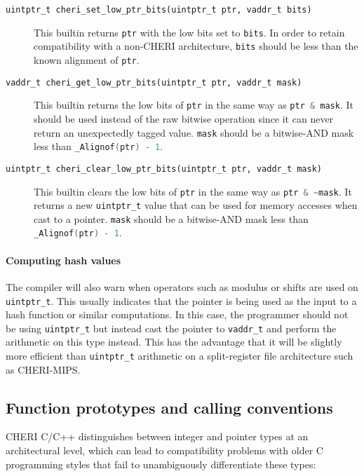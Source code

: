 \documentclass[11pt]{article}
\newcommand{\ccode}[1]{\lstinline[language={C},basicstyle=\small\ttfamily]{#1}}
\newcommand{\uintptr}{\texttt{uintptr\_t}\xspace}
\newcommand{\vaddrt}{\texttt{vaddr\_t}\xspace}
\begin{document}
\begin{description}
\item[\texttt{uintptr\_t cheri\_set\_low\_ptr\_bits(uintptr\_t ptr, vaddr\_t bits)}]
  This builtin returns \texttt{ptr} with the low bits set to \texttt{bits}. In order to retain
  compatibility with a non-CHERI architecture, \texttt{bits} should be less than the
  known alignment of \texttt{ptr}.
\item[\texttt{vaddr\_t cheri\_get\_low\_ptr\_bits(uintptr\_t ptr, vaddr\_t mask)}]
  This builtin returns the low bits of \texttt{ptr} in the same way as \ccode{ptr & mask}.
  It should be used instead of the raw bitwise operation since it can never return
  an unexpectedly tagged value.
  \texttt{mask} should be a bitwise-AND mask less than \ccode{_Alignof(ptr) - 1}.
\item[\texttt{uintptr\_t cheri\_clear\_low\_ptr\_bits(uintptr\_t ptr, vaddr\_t mask)}]
  This builtin clears the low bits of \texttt{ptr} in the same way as \ccode{ptr & ~mask}.
  It returns a new \uintptr value that can be used for memory accesses when cast to a pointer.
  \texttt{mask} should be a bitwise-AND mask less than \ccode{_Alignof(ptr) - 1}.
\end{description}

\paragraph{Computing hash values}

The compiler will also warn when operators such as modulus or shifts are used on
\uintptr. This usually indicates that the pointer is being used as the input to a hash
function or similar computations.
In this case, the programmer should not be using \uintptr but instead cast the pointer
to \vaddrt and perform the arithmetic on this type instead.
This has the advantage that it will be slightly more efficient than \uintptr arithmetic on
a split-register file architecture such as CHERI-MIPS.


\subsection{Function prototypes and calling conventions}

CHERI C/C++ distinguishes between integer and pointer types at an
architectural level, which can lead to compatibility problems with older C
programming styles that fail to unambiguously differentiate these types:
\end{document}
